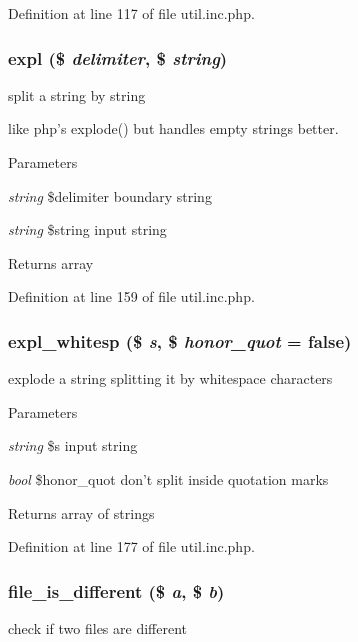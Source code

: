 Definition at line 117 of file util.inc.php.

\hypertarget{util_8inc_8php_aafce787d4b725ac62be6306ff3e352e7}{
\subsubsection[{expl}]{\setlength{\rightskip}{0pt plus 5cm}expl (\$ {\em delimiter}, \/  \$ {\em string})}}
\label{util_8inc_8php_aafce787d4b725ac62be6306ff3e352e7}
split a string by string

like php's explode() but handles empty strings better. 
\begin{DoxyParams}{Parameters}
\item[{\em string}]\$delimiter boundary string \item[{\em string}]\$string input string \end{DoxyParams}
\begin{DoxyReturn}{Returns}
array 
\end{DoxyReturn}


Definition at line 159 of file util.inc.php.

\hypertarget{util_8inc_8php_a1d2500a5e237e59956b03cbea845c95a}{
\subsubsection[{expl\_\-whitesp}]{\setlength{\rightskip}{0pt plus 5cm}expl\_\-whitesp (\$ {\em s}, \/  \$ {\em honor\_\-quot} = {\ttfamily false})}}
\label{util_8inc_8php_a1d2500a5e237e59956b03cbea845c95a}
explode a string splitting it by whitespace characters


\begin{DoxyParams}{Parameters}
\item[{\em string}]\$s input string \item[{\em bool}]\$honor\_\-quot don't split inside quotation marks \end{DoxyParams}
\begin{DoxyReturn}{Returns}
array of strings 
\end{DoxyReturn}


Definition at line 177 of file util.inc.php.

\hypertarget{util_8inc_8php_a9c9a81ec9dba8b2870cbb365f8139866}{
\subsubsection[{file\_\-is\_\-different}]{\setlength{\rightskip}{0pt plus 5cm}file\_\-is\_\-different (\$ {\em a}, \/  \$ {\em b})}}
\label{util_8inc_8php_a9c9a81ec9dba8b2870cbb365f8139866}
check if two files are different


